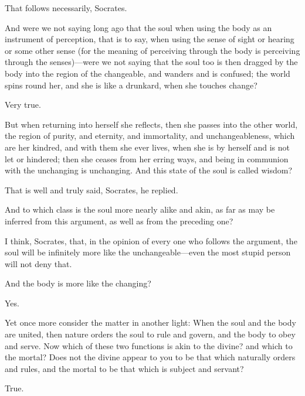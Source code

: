 \documentclass[11pt,letter]{article}
\begin{document}
\par  That follows necessarily, Socrates.

\par  And were we not saying long ago that the soul when using the body as an instrument of perception, that is to say, when using the sense of sight or hearing or some other sense (for the meaning of perceiving through the body is perceiving through the senses)—were we not saying that the soul too is then dragged by the body into the region of the changeable, and wanders and is confused; the world spins round her, and she is like a drunkard, when she touches change?

\par  Very true.

\par  But when returning into herself she reflects, then she passes into the other world, the region of purity, and eternity, and immortality, and unchangeableness, which are her kindred, and with them she ever lives, when she is by herself and is not let or hindered; then she ceases from her erring ways, and being in communion with the unchanging is unchanging. And this state of the soul is called wisdom?

\par  That is well and truly said, Socrates, he replied.

\par  And to which class is the soul more nearly alike and akin, as far as may be inferred from this argument, as well as from the preceding one?

\par  I think, Socrates, that, in the opinion of every one who follows the argument, the soul will be infinitely more like the unchangeable—even the most stupid person will not deny that.

\par  And the body is more like the changing?

\par  Yes.

\par  Yet once more consider the matter in another light: When the soul and the body are united, then nature orders the soul to rule and govern, and the body to obey and serve. Now which of these two functions is akin to the divine? and which to the mortal? Does not the divine appear to you to be that which naturally orders and rules, and the mortal to be that which is subject and servant?

\par  True.
\end{document}
